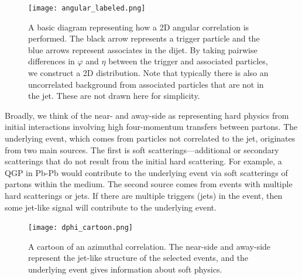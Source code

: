 \documentclass[../main.tex]{subfiles}
\begin{document}

\begin{figure}[h]
    \centering
    \texttt{[image: angular\_labeled.png]}
    \caption{A basic diagram representing how a 2D angular correlation is performed. The black arrow represents a trigger particle and the blue arrows represent associates in the dijet. By taking pairwise differences in $\varphi$ and $\eta$ between the trigger and associated particles, we construct a 2D distribution. Note that typically there is also an uncorrelated background from associated particles that are not in the jet. These are not drawn here for simplicity.}
    \label{fig:angular}
\end{figure}

Broadly, we think of the near- and away-side as representing hard physics from initial interactions involving high four-momentum transfers between partons. The underlying event, which comes from particles not correlated to the jet, originates from two main sources. The first is soft scatterings---additional or secondary scatterings that do not result from the initial hard scattering. For example, a QGP in Pb-Pb would contribute to the underlying event via soft scatterings of partons within the medium. The second source comes from events with multiple hard scatterings or jets. If there are multiple triggers (jets) in the event, then some jet-like signal will contribute to the underlying event. 

\begin{figure}
    \centering
    \texttt{[image: dphi\_cartoon.png]}
    \caption{A cartoon of an azimuthal correlation. The near-side and away-side represent the jet-like structure of the selected events, and the underlying event gives information about soft physics. }
    \label{fig:dphi_cartoon}
\end{figure}
\end{document}
